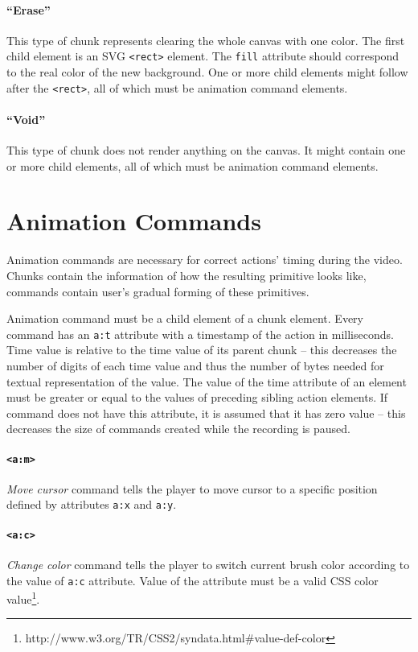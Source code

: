 \paragraph{``Erase''}
This type of chunk represents clearing the whole canvas with one color. The first child element is an SVG \verb|<rect>| element. The \verb|fill| attribute should correspond to the real color of the new background. One or more child elements might follow after the \verb|<rect>|, all of which must be animation command elements.

\paragraph{``Void''}
This type of chunk does not render anything on the canvas. It might contain one or more child elements, all of which must be animation command elements.

\section{Animation Commands}
Animation commands are necessary for correct actions' timing during the video. Chunks contain the information of how the resulting primitive looks like, commands contain user's gradual forming of these primitives.

Animation command must be a child element of a chunk element. Every command has an \verb|a:t| attribute with a timestamp of the action in milliseconds. Time value is relative to the time value of its parent chunk -- this decreases the number of digits of each time value and thus the number of bytes needed for textual representation of the value. The value of the time attribute of an element must be greater or equal to the values of preceding sibling action elements. If command does not have this attribute, it is assumed that it has zero value -- this decreases the size of commands created while the recording is paused.

\paragraph{\texttt{\textless a:m\textgreater}}
\textit{Move cursor} command tells the player to move cursor to a specific position defined by attributes \verb|a:x| and \verb|a:y|.

\paragraph{\texttt{\textless a:c\textgreater}}
\textit{Change color} command tells the player to switch current brush color according to the value of \verb|a:c| attribute. Value of the attribute must be a valid CSS color value\footnote{http://www.w3.org/TR/CSS2/syndata.html\#value-def-color}.

